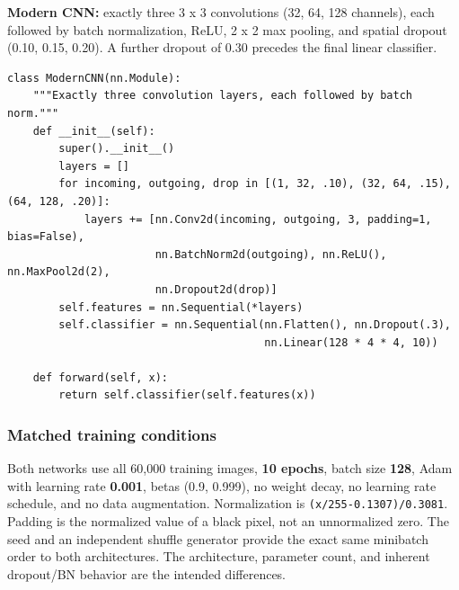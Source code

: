 \documentclass[10pt,a4paper]{article}
\newcommand{\passthrough}[1]{#1}
\begin{document}
\textbf{Modern CNN:} exactly three 3 x 3 convolutions (32, 64, 128 channels), each followed by batch normalization, ReLU, 2 x 2 max pooling, and spatial dropout (0.10, 0.15, 0.20). A further dropout of 0.30 precedes the final linear classifier.

\par\noindent\begin{minipage}{\linewidth}
\begin{lstlisting}
class ModernCNN(nn.Module):
    """Exactly three convolution layers, each followed by batch norm."""
    def __init__(self):
        super().__init__()
        layers = []
        for incoming, outgoing, drop in [(1, 32, .10), (32, 64, .15), (64, 128, .20)]:
            layers += [nn.Conv2d(incoming, outgoing, 3, padding=1, bias=False),
                       nn.BatchNorm2d(outgoing), nn.ReLU(), nn.MaxPool2d(2),
                       nn.Dropout2d(drop)]
        self.features = nn.Sequential(*layers)
        self.classifier = nn.Sequential(nn.Flatten(), nn.Dropout(.3),
                                        nn.Linear(128 * 4 * 4, 10))

    def forward(self, x):
        return self.classifier(self.features(x))
\end{lstlisting}
\end{minipage}\par

\subsubsection{Matched training conditions}\label{matched-training-conditions}

Both networks use all 60,000 training images, \textbf{10 epochs}, batch size \textbf{128}, Adam with learning rate \textbf{0.001}, betas (0.9, 0.999), no weight decay, no learning rate schedule, and no data augmentation. Normalization is \passthrough{\lstinline!(x/255-0.1307)/0.3081!}. Padding is the normalized value of a black pixel, not an unnormalized zero. The seed and an independent shuffle generator provide the exact same minibatch order to both architectures. The architecture, parameter count, and inherent dropout/BN behavior are the intended differences.
\end{document}
